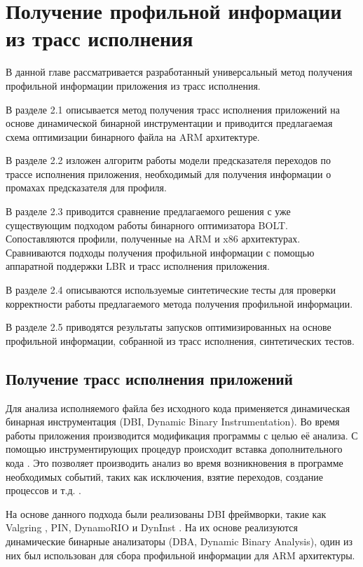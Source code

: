 \chapter{Получение профильной информации из трасс исполнения}\label{ch:ch2}

В данной главе рассматривается разработанный универсальный метод получения профильной информации приложения из трасс исполнения.

В разделе 2.1 описывается метод получения трасс исполнения приложений на основе динамической бинарной инструментации и приводится предлагаемая схема оптимизации бинарного файла на ARM архитектуре.

В разделе 2.2 изложен алгоритм работы модели предсказателя переходов по трассе исполнения приложения, необходимый для получения информации о промахах предсказателя для профиля.

В разделе 2.3 приводится сравнение предлагаемого решения с уже существующим подходом работы бинарного оптимизатора BOLT. Сопоставляются профили, полученные на ARM и x86 архитектурах. Сравниваются подходы получения профильной информации с помощью аппаратной поддержки LBR и трасс исполнения приложения.

В разделе 2.4 описываются используемые синтетические тесты для проверки корректности работы предлагаемого метода получения профильной информации.

В разделе 2.5 приводятся результаты запусков оптимизированных на основе профильной информации, собранной из трасс исполнения, синтетических тестов.

\section{Получение трасс исполнения приложений}\label{sec:ch2/sec2}
Для анализа исполняемого файла без исходного кода применяется динамическая бинарная инструментация (DBI, Dynamic Binary Instrumentation). Во время работы приложения производится модификация программы с целью её анализа. С помощью инструментирующих процедур происходит вставка дополнительного кода \cite{Nethercote2007}. Это позволяет производить анализ во время возникновения в программе необходимых событий, таких как исключения, взятие переходов, создание процессов и т.д. \cite{Li2007}.

На основе данного подхода были реализованы DBI фреймворки, такие как Valgring \cite{Nethercote2003}, PIN, DynamoRIO \cite{Bruening2003} и DynInst \cite{Rimsa2019}. На их основе реализуются динамические бинарные анализаторы (DBA, Dynamic Binary Analysis), один из них был использован для сбора профильной информации для ARM архитектуры\cite{Hazelwood2006}. 

